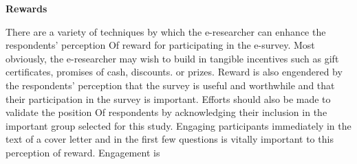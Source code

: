 \documentclass{book}
\begin{document}
\textbf{ Rewards}\par There are a variety of techniques by which the e-researcher can enhance the respondents' perception Of reward for participating in the e-survey. Most obviously, the e-researcher may wish to build in tangible incentives such as gift certificates, promises of cash, discounts. or prizes. Reward is also engendered by the respondents' perception that the survey is useful and worthwhile and that their participation in the survey is important. Efforts should also be made to validate the position Of respondents by acknowledging their inclusion in the important group selected for this study. Engaging participants immediately in the text of a cover letter and in the first few questions is vitally important to this perception of reward. Engagement is
\end{document}
